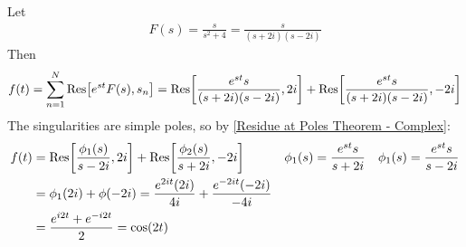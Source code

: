 \documentclass[12pt, english]{book}
\begin{document}
	\begin{example}
		Let 
		\begin{align*}
			F(s) = \frac{s}{s^2 + 4} = \frac{s}{(s+2i)(s-2i)}
		\end{align*}
		Then
		\begin{align*}
			f(t) 
			= \sum_{n=1}^{N} \Res[e^{st} F(s), s_n]
			= \Res[\frac{e^{st} s}{(s+2i)(s-2i)}, 2i] + \Res[\frac{e^{st} s}{(s+2i)(s-2i)}, -2i]
		\end{align*}
		The singularities are simple poles, so by \cref{Residue at Poles Theorem - Complex}:
		\begin{align*}
			f(t) 
			&= \Res[\frac{\phi_1 (s)}{s-2i}, 2i] + \Res[\frac{\phi_2 (s)}{s+2i}, -2i] &
				\phi_1 (s) &= \frac{e^{st} s}{s + 2i} &
				\phi_1 (s) &= \frac{e^{st} s}{s - 2i} \\
			&= \phi_1(2i) + \phi(-2i) = \frac{e^{2it} (2i)}{4i} + \frac{e^{-2it} (-2i)}{-4i} \\
			&= \frac{e^{i2t} + e^{-i2t}}{2} = \cos(2t)
		\end{align*}
	\end{example}
\end{document}

